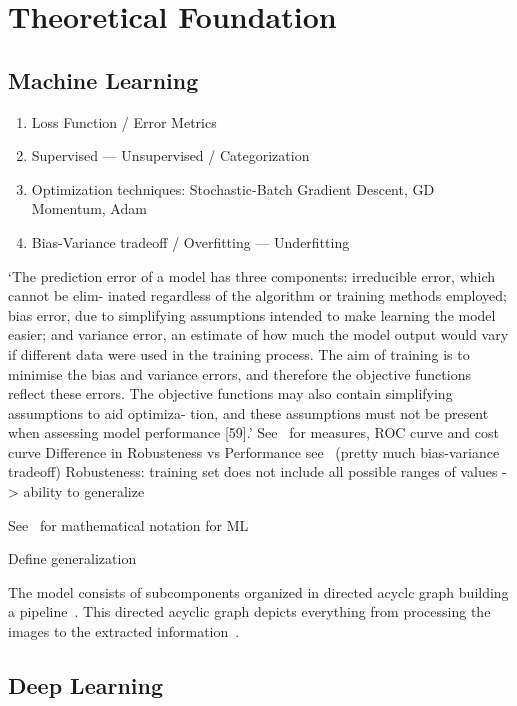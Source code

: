 \chapter{Theoretical Foundation}\label{ch:theoretical}

\section{Machine Learning}

\begin{enumerate}
    \item Loss Function / Error Metrics
    \item Supervised --- Unsupervised / Categorization
    \item Optimization techniques: Stochastic-Batch Gradient Descent, GD Momentum, Adam
    \item Bias-Variance tradeoff / Overfitting --- Underfitting
\end{enumerate}

`The prediction error of a model has three components: irreducible error, which cannot be elim-
inated regardless of the algorithm or training methods employed; bias error, due to simplifying
assumptions intended to make learning the model easier; and variance error, an estimate of how
much the model output would vary if different data were used in the training process. The aim
of training is to minimise the bias and variance errors, and therefore the objective functions
reflect these errors. The objective functions may also contain simplifying assumptions to aid
optimiza- tion, and these assumptions must not be present when assessing model
performance [59].'\citep{ashmore_assuring_2021}
See~\citep{ashmore_assuring_2021} for measures, ROC curve and cost curve
Difference in Robusteness vs Performance see~\citep{ashmore_assuring_2021} (pretty much
bias-variance tradeoff)
Robusteness: training set does not include all possible ranges of values -> ability to generalize

See~\citep{seshia_formal_2018} for mathematical notation for ML

Define generalization


The model consists of subcomponents organized in directed acyclc graph building a
pipeline~\citep{siebert_construction_2021}.
This directed acyclic graph depicts everything from processing the images to the extracted
information~\citep{siebert_construction_2021}.
\section{Deep Learning}


